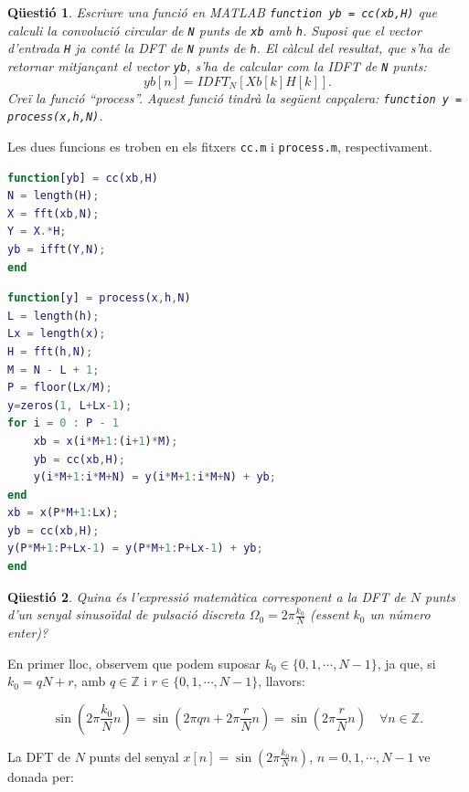 \documentclass[11pt,a4]{article}
\numberwithin{equation}{section}
\theoremstyle{thmstyle}
\theoremstyle{thmstyle}
\theoremstyle{thmstyle}
\theoremstyle{thmstyle}
\theoremstyle{thmstyle}
\theoremstyle{thmstyle}
\newtheorem{question}{Qüestió}
\theoremstyle{thmstyle}
\begin{document}
\begin{question}
Escriure una funció en MATLAB {\tt function yb = cc(xb,H)} que calculi la convolució circular de {\tt N} punts de {\tt xb} amb {\tt h}. Suposi que el vector d'entrada {\tt H} ja conté la DFT de {\tt N} punts de {\tt h}. El càlcul del resultat, que s'ha de retornar mitjançant el vector {\tt yb}, s'ha de calcular com la IDFT de {\tt N} punts:
$$
yb[n] = IDFT_N [Xb[k]H[k]].
$$
Creï la funció ``process''. Aquest funció tindrà la següent capçalera: {\tt function y = process(x,h,N)}.
\end{question}

Les dues funcions es troben en els fitxers {\tt cc.m} i {\tt process.m}, respectivament.

\begin{lstlisting}[language=MATLAB]
function[yb] = cc(xb,H)
N = length(H);
X = fft(xb,N);
Y = X.*H;
yb = ifft(Y,N);
end
\end{lstlisting}

\begin{lstlisting}[language=MATLAB]
function[y] = process(x,h,N)
L = length(h);
Lx = length(x);
H = fft(h,N);
M = N - L + 1;
P = floor(Lx/M);
y=zeros(1, L+Lx-1);
for i = 0 : P - 1
    xb = x(i*M+1:(i+1)*M);
    yb = cc(xb,H);
    y(i*M+1:i*M+N) = y(i*M+1:i*M+N) + yb;
end
xb = x(P*M+1:Lx);
yb = cc(xb,H);
y(P*M+1:P+Lx-1) = y(P*M+1:P+Lx-1) + yb;
end
\end{lstlisting}

\begin{question}
Quina és l'expressió matemàtica corresponent a la DFT de $N$ punts d'un senyal sinusoïdal de pulsació discreta $\Omega_0=2\pi\frac{k_0}{N}$ (essent $k_0$ un número enter)?
\end{question}

En primer lloc, observem que podem suposar $k_0\in\lbrace 0,1,\cdots,N-1\rbrace$, ja que, si $k_0=qN+r$, amb $q\in\mathbb{Z}$ i $r\in\lbrace 0,1,\cdots,N-1\rbrace$, llavors:

$$
\sin(2\pi\frac{k_0}{N}n) = \sin(2\pi qn + 2\pi\frac{r}{N}n) = \sin(2\pi\frac{r}{N}n) \quad \forall n\in\mathbb{Z}.
$$

La DFT de $N$ punts del senyal $x[n]=\sin(2\pi\frac{k_0}{N}n)$, $n=0,1,\cdots, N-1$ ve donada per:
\end{document}
